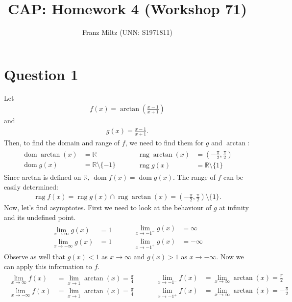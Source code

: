 \documentclass{article}
\title{CAP: Homework 4 (Workshop 71)}
\author{Franz Miltz (UNN: S1971811)}
\DeclareMathOperator{\dom}{dom}
\DeclareMathOperator{\range}{rng}
\begin{document}
\maketitle
\section*{Question 1}
Let
\begin{align*}
  f(x) = \arctan\left(\frac{x-1}{x+1}\right)
\end{align*}
and
\begin{align*}
  g(x) = \frac{x-1}{x+1}.
\end{align*}
Then, to find the domain and range of $f$, we need to find them for $g$ and $\arctan$:
\begin{align*}
  \begin{aligned}
    \dom \arctan(x) &= \mathbb{R}\\
    \dom g(x) &= \mathbb{R} \setminus \{-1\}
  \end{aligned}
  \hspace{1cm}
  \begin{aligned}
    \range \arctan(x) &= \left(-\frac{\pi}{2}, \frac{\pi}{2}\right)\\
    \range g(x) &= \mathbb{R}\setminus\{1\}
  \end{aligned}
\end{align*}
Since arctan is defined on $\mathbb{R}$, $\dom f(x) = \dom g(x)$. The range of $f$ can be easily determined: 
\begin{align*}
  \range f(x) = \range g(x) \cap \range \arctan(x) = \left(-\frac{\pi}{2}, \frac{\pi}{2}\right) \setminus \{1\}.
\end{align*}
Now, let's find asymptotes. First we need to look at the behaviour of $g$ at infinity and its undefined point.
\begin{align*}
  \begin{aligned}
    \lim_{x\to\infty}g(x) &= 1\\
    \lim_{x\to-\infty}g(x) &= 1
  \end{aligned}
  \hspace{1cm}
  \begin{aligned}
    \lim_{x\to-1^-}g(x)&=\infty\\
    \lim_{x\to-1^+}g(x)&=-\infty
  \end{aligned}
\end{align*}
Observe as well that $g(x)<1$ as $x\to\infty$ and $g(x)>1$ as $x\to-\infty$. Now we can apply this information to $f$.
\begin{align*}
  \begin{aligned}
    \lim_{x\to\infty}f(x) &= \lim_{x\to 1}\arctan(x)=\frac{\pi}{4}\\
    \lim_{x\to-\infty}f(x) &= \lim_{x\to 1}\arctan(x)=\frac{\pi}{4}
  \end{aligned}
  \hspace{1cm}
  \begin{aligned}
    \lim_{x\to-1^-}f(x) &= \lim_{x\to\infty}\arctan(x)= \frac{\pi}{2}\\
    \lim_{x\to-1^+}f(x) &= \lim_{x\to\infty}\arctan(x)=-\frac{\pi}{2}
  \end{aligned}
\end{align*}
\end{document}
